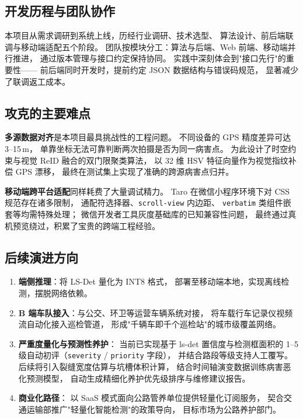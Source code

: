 \documentclass[UTF8, a4paper, fontset=ubuntu]{ctexart}
\begin{document}
  \subsection{开发历程与团队协作}

  本项目从需求调研到系统上线，历经行业调研、技术选型、
  算法设计、前后端联调与移动端适配五个阶段。
  团队按模块分工：算法与后端、Web 前端、移动端并行推进，
  通过版本管理与接口约定保持协同。
  实践中深刻体会到"接口先行"的重要性——
  前后端同时开发时，提前约定 JSON 数据结构与错误码规范，
  显著减少了联调返工成本。

  \subsection{攻克的主要难点}

  \textbf{多源数据对齐}是本项目最具挑战性的工程问题。
  不同设备的 GPS 精度差异可达 3--15\,m，
  单靠坐标无法可靠判断两次拍摄是否为同一病害点。
  为此设计了时空约束与视觉 ReID 融合的双门限聚类算法，
  以 32 维 HSV 特征向量作为视觉指纹补偿 GPS 漂移，
  最终在测试集上实现了准确的跨源病害点归并。

  \textbf{移动端跨平台适配}同样耗费了大量调试精力。
  Taro 在微信小程序环境下对 CSS 规范存在诸多限制，
  通配符选择器、\texttt{scroll-view} 内边距、
  \texttt{verbatim} 类组件嵌套等均需特殊处理；
  微信开发者工具灰度基础库的已知兼容性问题，
  最终通过真机预览绕过，积累了宝贵的跨端工程经验。

  \subsection{后续演进方向}

  \begin{enumerate}[label=\arabic*., itemsep=2pt]
      \item \textbf{端侧推理}：将 LS-Det 量化为 INT8 格式，
      部署至移动端本地，实现离线检测，摆脱网络依赖。

      \item \textbf{B 端车队接入}：与公交、环卫等运营车辆系统对接，
      将车载行车记录仪视频流自动化接入巡检管道，
      形成"千辆车即千个巡检站"的城市级覆盖网络。

      \item \textbf{严重度量化与预测性养护}：
      当前已实现基于 ls-det 置信度与检测框面积的 1--5 级自动初评（\texttt{severity} / \texttt{priority} 字段），
      并结合路段等级支持人工覆写。后续将引入裂缝宽度估算与坑槽体积计算，
      结合时间轴演变数据训练病害恶化预测模型，
      自动生成精细化养护优先级排序与维修建议报告。

      \item \textbf{商业化路径}：
      以 SaaS 模式面向公路管养单位提供轻量化订阅服务，
      契合交通运输部推广"轻量化智能检测"的政策导向，
      目标市场为公路养护部门。
  \end{enumerate}
\end{document}
